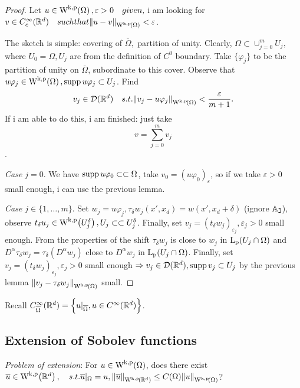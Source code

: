 \documentclass{article}
\begin{document}
\begin{proof}
Let $u \in \WkpSet{\Omega}, \varepsilon >0 \quad{given},$ i am looking for $v \in C^{\infty}_c(\R^d) \quad{such that} \norm{u-v}_{\WkpSet{\Omega}} < \varepsilon$.

The sketch is simple: covering of $\overline{\Omega},$ partition of unity.
Clearly, $\Omega \subset \cup_{j=0}^m U_j,$ where $U_0 = \Omega, U_j$ are from the definition of $C^0$ boundary. Take $\{\varphi_j\}$ to be the partition of unity on $\overline{\Omega}$, subordinate to this cover. Observe that $u \varphi_j \in \WkpSet{\Omega}, \supp u \varphi_j \subset U_j$. Find
\[
	v_j \in \mathcal{D}(\R^d) \quad{s.t.} \norm{v_j - u \varphi_j}_{\WkpSet{\Omega}}< \frac{\varepsilon}{m+1}.
\]
If i am able to do this, i am finished: just take
\[
	v=\sum_{j=0}^m v_j
\]
.

\textit{Case $j=0$}. We have $ \operatorname{supp} u \varphi_0 \subset \subset \Omega$, take $v_0 = (u \varphi_0)_{\varepsilon}$, so if we take $\varepsilon >0 $ small enough, i can use the previous lemma.

\textit{Case $j \in \{1,\dots,m\} $}.
Set $w_j = u \varphi_j, \tau_{\delta}w_j(x', x_d) = w(x', x_d + \delta)$ (ignore $\mathbb{A_j}$), observe $t_{\delta}u_j \in \WkpSet{U^{\delta}_j}, U_j \subset \subset U^{\delta}_j$. Finally, set $v_j = (t_{\delta}w_j)_{\varepsilon_j}, \varepsilon_j >0$ small enough. From the properties of the shift $\tau_{\delta} w_j$ is close to $w_j$ in $\LpSet{U_j \cap \Omega}$ and $D^\alpha \tau_{\delta}w_j = \tau_{\delta}(D^\alpha w_j)$ close to $D^\alpha w_j$ in $\LpSet{U_j \cap \Omega}$. Finally, set $v_j = (t_{\delta} w_j)_{\varepsilon_j}, \varepsilon_j >0 $ small enough $\Rightarrow v_j \in \mathcal{D}({\mathbb R}^d), \operatorname{supp} v_j \subset U_j$ by the previous lemma $ \norm{v_j - \tau_{\delta}w_j}_{\WkpSet{\Omega}}$ small. 

\end{proof}	

\begin{remark}
	Recall $C^\infty_{\overline{\Omega}}({\mathbb R}^d) = \Big\{u|_{\overline{\Omega}}, u \in C^{\infty}({\mathbb R}^d) \Big\}$.
\end{remark}

\subsection{Extension of Sobolev functions}
\label{sec:extension}

\textit{Problem of extension}: For $u \in \WkpSet{\Omega}$, does there exist $\overline{u} \in \WkpSet{\R^d}, \quad{s.t. } \overline{u}|_{\Omega}=u, \norm{\overline{u}}_{\WkpSet{\R^d}} \leq C(\Omega) \norm{u}_{\WkpSet{\Omega}}$?
\end{document}
